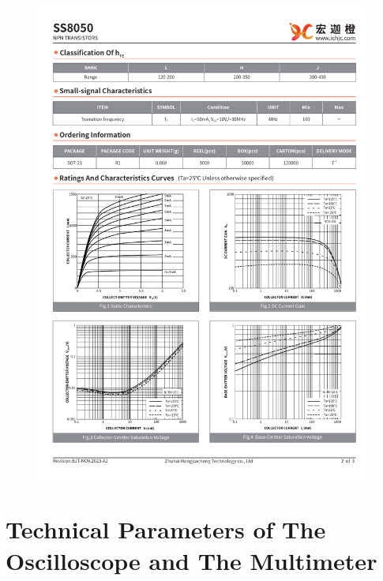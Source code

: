 \documentclass[UTF8]{article}
\begin{document}
\begin{figure}[H]\centering
    \includegraphics[width=\columnwidth]{preview/assets/SS8050_3.pdf}
\end{figure}

\section{Technical Parameters of The Oscilloscope and The Multimeter}
\end{document}
